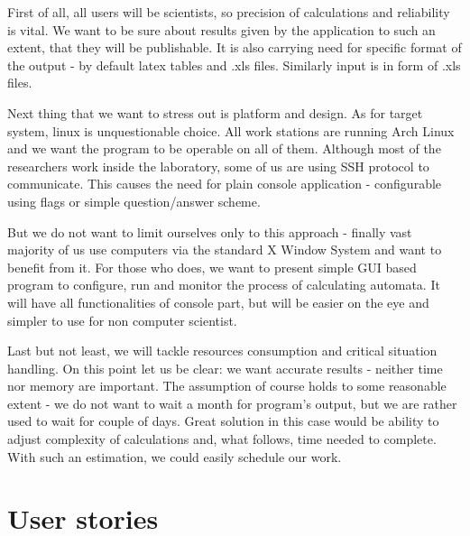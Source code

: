 \documentclass{article}
\begin{document}
First of all, all users will be scientists, so precision of calculations and reliability is vital. We want to be sure about results given by the application to such an extent, that they will be publishable. It is also carrying need for specific format of the output - by default latex tables and .xls files. Similarly input is in form of .xls files.


Next thing that we want to stress out is platform and design. As for target system, linux is unquestionable choice. All work stations are running Arch Linux and we want the program to be operable on all of them. Although most of the researchers work inside the laboratory, some of us are using SSH protocol to communicate. This causes the need for plain console application - configurable using flags or simple question/answer scheme. 

But we do not want to limit ourselves only to this approach - finally vast majority of us use computers via the standard X Window System and want to benefit from it. For those who does, we want to present simple GUI based program to configure, run and monitor the process of calculating automata. It will have all functionalities of console part, but will be easier on the eye and simpler to use for non computer scientist.


Last but not least, we will tackle resources consumption and critical situation handling. On this point let us be clear: we want accurate results - neither time nor memory are important. The assumption of course holds to some reasonable extent - we do not want to wait a month for program's output, but we are rather used to wait for couple of days. Great solution in this case would be ability to adjust complexity of calculations and, what follows, time needed to complete. With such an estimation, we could easily schedule our work.


\newpage
\section{User stories}


%
%
\end{document}
